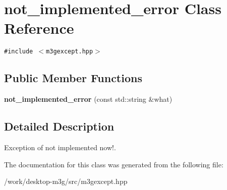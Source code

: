\hypertarget{classm3g_1_1not__implemented__error}{
\section{not\_\-implemented\_\-error Class Reference}
\label{classm3g_1_1not__implemented__error}
}
{\tt \#include $<$m3gexcept.hpp$>$}

\subsection*{Public Member Functions}
\begin{CompactItemize}
\item 
\hypertarget{classm3g_1_1not__implemented__error_2190a4bdd3d31c601366fe5a5ba6929e}{
\textbf{not\_\-implemented\_\-error} (const std::string \&what)}
\label{classm3g_1_1not__implemented__error_2190a4bdd3d31c601366fe5a5ba6929e}

\end{CompactItemize}


\subsection{Detailed Description}
Exception of not implemented now!. 

The documentation for this class was generated from the following file:\begin{CompactItemize}
\item 
/work/desktop-m3g/src/m3gexcept.hpp\end{CompactItemize}
